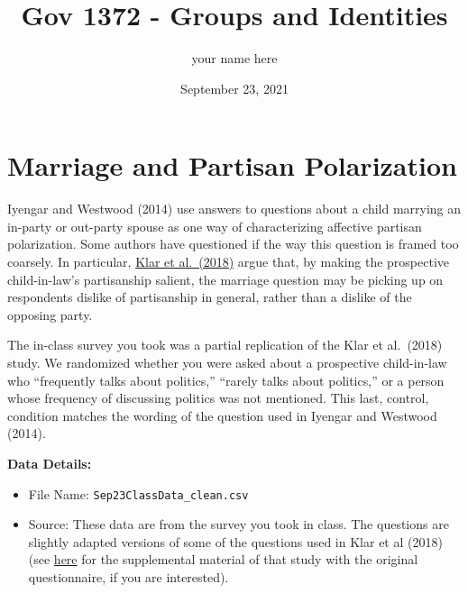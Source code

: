 \documentclass[
]{article}
\title{Gov 1372 - Groups and Identities}
\author{your name here}
\date{September 23, 2021}
\begin{document}
\maketitle

\hypertarget{marriage-and-partisan-polarization}{%
\section{Marriage and Partisan
Polarization}\label{marriage-and-partisan-polarization}}

Iyengar and Westwood (2014) use answers to questions about a child
marrying an in-party or out-party spouse as one way of characterizing
affective partisan polarization. Some authors have questioned if the way
this question is framed too coarsely. In particular,
\href{https://drive.google.com/file/d/1FOAPqfLQweUFaXtzLGhJT_kkBRwHWkLu/view?usp=sharing}{Klar
et al.~(2018)} argue that, by making the prospective child-in-law's
partisanship salient, the marriage question may be picking up on
respondents dislike of partisanship in general, rather than a dislike of
the opposing party.

The in-class survey you took was a partial replication of the Klar et
al.~(2018) study. We randomized whether you were asked about a
prospective child-in-law who ``frequently talks about politics,''
``rarely talks about politics,'' or a person whose frequency of
discussing politics was not mentioned. This last, control, condition
matches the wording of the question used in Iyengar and Westwood (2014).

\textbf{Data Details:}

\begin{itemize}
\item
  File Name: \texttt{Sep23ClassData\_clean.csv}
\item
  Source: These data are from the survey you took in class. The
  questions are slightly adapted versions of some of the questions used
  in Klar et al (2018) (see
  \href{https://oup.silverchair-cdn.com/oup/backfile/Content_public/Journal/poq/82/2/10.1093_poq_nfy014/1/nfy014_suppl_supplementary_appendix.pdf?Expires=1635436645\&Signature=w4p6NVT1Wrv3tcOJMw~B1LaNxM2-HZIJRtb7fWWqFHKodmLQBO3QeG3qWudEDeJjDT2XhmC3ud8WkNAptT0Hxc3bl47AsAIuMJyQEYMxcJ4W-hYevLRX7GoWNe13yxsXzOe~Q8Fs0kBjiWJf-P9AAkNB-eWZWMtznzPgBnanfRjwWzEB~ziBHcNOGi7I0FNBHSna7Igih6F~tFmuUcSVtvKGJ1IUFE86mc0IyeQLNxzAoz7n7v5ZrI~9J6hzE7wKfDn~ASRJ3icDtx2gN0J2KUVuN-nEIs~0yMNMzp4btpAq8aYp90AmMGHtemsUPoaogAz3PoA4oJNXFCpPNdiFjA__\&Key-Pair-Id=APKAIE5G5CRDK6RD3PGA}{here}
  for the supplemental material of that study with the original
  questionnaire, if you are interested).
\end{itemize}
\end{document}
